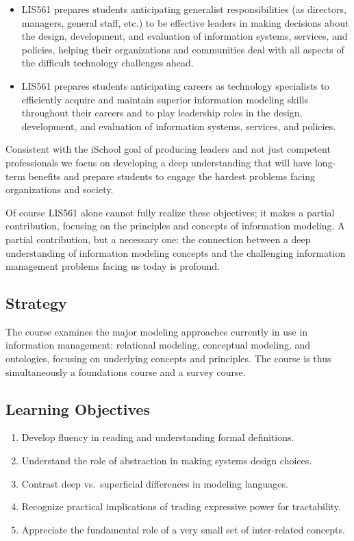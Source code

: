 \documentclass[]{article}
\providecommand{\tightlist}{%
  \setlength{\itemsep}{0pt}\setlength{\parskip}{0pt}}
\begin{document}
\begin{itemize}
\tightlist
\item
  LIS561 prepares students anticipating generalist responsibilities (as
  directors, managers, general staff, etc.) to be effective leaders in
  making decisions about the design, development, and evaluation of
  information systems, services, and policies, helping their
  organizations and communities deal with all aspects of the difficult
  technology challenges ahead.
\item
  LIS561 prepares students anticipating careers as technology
  specialists to efficiently acquire and maintain superior information
  modeling skills throughout their careers and to play leadership roles
  in the design, development, and evaluation of information systems,
  services, and policies.
\end{itemize}

Consistent with the iSchool goal of producing leaders and not just
competent professionals we focus on developing a deep understanding that
will have long-term benefits and prepare students to engage the hardest
problems facing organizations and society.

Of course LIS561 alone cannot fully realize these objectives; it makes a
partial contribution, focusing on the principles and concepts of
information modeling. A partial contribution, but a necessary one: the
connection between a deep understanding of information modeling concepts
and the challenging information management problems facing us today is
profound.

\subsection{Strategy}\label{strategy}

The course examines the major modeling approaches currently in use in
information management: relational modeling, conceptual modeling, and
ontologies, focusing on underlying concepts and principles. The course
is thus simultaneously a foundations course and a survey course.

\subsection{Learning Objectives}\label{learning-objectives}

\begin{enumerate}
\def\labelenumi{\arabic{enumi}.}
\tightlist
\item
  Develop fluency in reading and understanding formal definitions.
\item
  Understand the role of abstraction in making systems design choices.
\item
  Contrast deep vs.~superficial differences in modeling languages.
\item
  Recognize practical implications of trading expressive power for
  tractability.
\item
  Appreciate the fundamental role of a very small set of inter-related
  concepts.
\end{enumerate}
\end{document}
